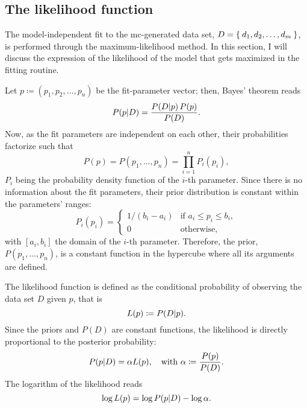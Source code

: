 \subsection{The likelihood function}

    The model-independent fit to the \ac{mc}-generated data set, $D = \Set{d_1, d_2,\dots, d_m}$, is performed through the maximum-likelihood method.
    In this section, I will discuss the expression of the likelihood of the model that gets maximized in the fitting routine.


    Let $p \coloneqq (p_1, p_2,\dots, p_n)$ be the fit-parameter vector; then, Bayes' theorem reads
    \begin{equation}
        P(p\vert D) = \frac{P(D\vert p)\, P(p)}{P(D)}.
    \end{equation}
    Now, as the fit parameters are independent on each other, their probabilities factorize such that
    \begin{equation}
        P(p) = P(p_1,\dots,p_n) = \prod_{i = 1}^n P_i(p_i),
    \end{equation}
    $P_i$ being the probability density function of the $i$-th parameter.
    Since there is no information about the fit parameters, their prior distribution is constant within the parameters' ranges:
    \begin{equation}\label{eq:flat_priors}
        P_i(p_i) =
        \begin{cases}
            1/(b_i - a_i) & \text{if } a_i \le p_i \le b_i, \\
            0             & \text{otherwise},
        \end{cases}
    \end{equation}
    with $[a_i, b_i]$ the domain of the $i$-th parameter.
    Therefore, the prior, $P(p_1,\dots,p_n)$, is a constant function in the hypercube where all its arguments are defined.


    The likelihood function is defined as the conditional probability of observing the data set $D$ given $p$, that is
    \begin{equation}
        L(p) \coloneqq P(D\vert p).
    \end{equation}
    Since the priors and $P(D)$ are constant functions, the likelihood is directly proportional to the posterior probability:
    \begin{equation}
        P(p\vert D) = \alpha L(p),\quad \text{with } \alpha \coloneqq \frac{P(p)}{P(D)}.
    \end{equation}
    The logarithm of the likelihood reads
    \begin{equation}
        \log L(p) = \log P(p\vert D) - \log \alpha.
    \end{equation}


